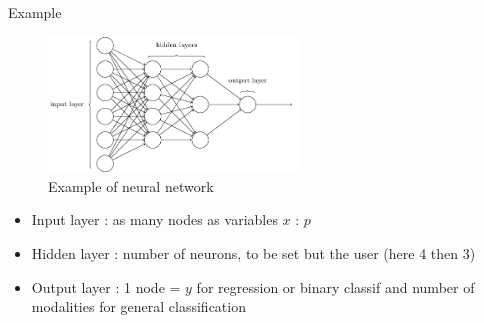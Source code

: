 \documentclass[ignorenonframetext,]{beamer}
\providecommand{\tightlist}{%
  \setlength{\itemsep}{0pt}\setlength{\parskip}{0pt}}
\begin{document}
\begin{frame}{Example}
\protect\hypertarget{example}{}

\begin{figure}
\centering
\includegraphics[width=2.60417in,height=\textheight]{mlp-network.png}
\caption{Example of neural network}
\end{figure}

\begin{itemize}
\tightlist
\item
  Input layer : as many nodes as variables \(x\) : \(p\)\\
\item
  Hidden layer : number of neurons, to be set but the user (here 4 then
  3)
\item
  Output layer : 1 node = \(y\) for regression or binary classif and
  number of modalities for general classification
\end{itemize}

\end{frame}
\end{document}
